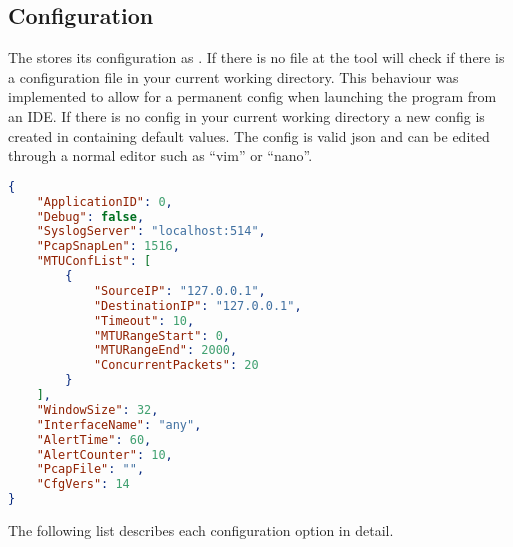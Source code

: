 \subsection{Configuration}
The \entool{} stores its configuration as . If there is no  file at  the tool will check if there is a configuration file in your current working directory. This behaviour was implemented to allow for a permanent config when launching the program from an \acs{IDE}. If there is no config in your current working directory a new config is created in  containing default values.
The config is valid json and can be edited through a normal editor such as \enquote{vim} or \enquote{nano}.

\begin{lstlisting}[language=json, caption=Sample configuration]
{
    "ApplicationID": 0,
    "Debug": false,
    "SyslogServer": "localhost:514",
    "PcapSnapLen": 1516,
    "MTUConfList": [
        {
            "SourceIP": "127.0.0.1",
            "DestinationIP": "127.0.0.1",
            "Timeout": 10,
            "MTURangeStart": 0,
            "MTURangeEnd": 2000,
            "ConcurrentPackets": 20
        }
    ],
    "WindowSize": 32,
    "InterfaceName": "any",
    "AlertTime": 60,
    "AlertCounter": 10,
    "PcapFile": "", 
    "CfgVers": 14
}
\end{lstlisting}

The following list describes each configuration option in detail.

